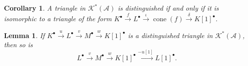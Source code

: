 \documentclass[11pt]{article}
\theoremstyle{thmstyle}
\newtheorem{lemma}[theorem]{Lemma}
\theoremstyle{defstyle}
\newtheorem{corollary}[theorem]{Corollary}
\newcommand{\scrA}{\mathscr{A}}
\newcommand{\scrK}{\mathscr{K}}
\newcommand{\cone}{\operatorname{cone}}
\begin{document}
\begin{corollary}
	A triangle in $\scrK^\ast(\scrA)$ is distinguished if and only if it is isomorphic to a triangle of the form $K^\bullet\xrightarrow{f} L^\bullet\xrightarrow{\iota}\cone(f)\xrightarrow{\delta} K[1]^\bullet$.
\end{corollary}

\begin{lemma}
	If $K^\bullet\xrightarrow{u} L^\bullet\xrightarrow{v} M^\bullet\xrightarrow{w} K[1]^\bullet$ is a distinguished triangle in $\scrK^\ast(\scrA)$, then so is 
	\begin{equation*}
		L^\bullet\xrightarrow{v} M^\bullet\xrightarrow{w} K[1]^\bullet\xrightarrow{-u[1]} L[1]^\bullet.
	\end{equation*}
\end{lemma}
\end{document}
